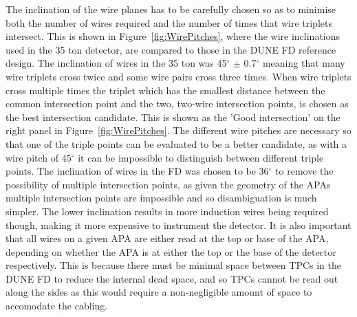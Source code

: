 The inclination of the wire planes has to be carefully chosen so as to minimise both the number of wires required and the number of times that wire triplets intersect. This is shown in Figure~\ref{fig:WirePitches}, where the wire inclinations used in the 35 ton detector, are compared to those in the DUNE FD reference design. The inclination of wires in the 35 ton was 45$^{\circ}$ $\pm$ 0.7$^{\circ}$ meaning that many wire triplets cross twice and some wire pairs cross three times. When wire triplets cross multiple times the triplet which has the smallest distance between the common intersection point and the two, two-wire intersection points, is chosen as the best intersection candidate. This is shown as the 'Good intersection' on the right panel in Figure~\ref{fig:WirePitches}. The different wire pitches are necessary so that one of the triple points can be evaluated to be a better candidate, as with a wire pitch of 45$^{\circ}$ it can be impossible to distinguish between different triple points. The inclination of wires in the FD was chosen to be 36$^{\circ}$ to remove the possibility of multiple intersection points, as given the geometry of the APAs multiple intersection points are impossible and so disambiguation is much simpler. The lower inclination results in more induction wires being required though, making it more expensive to instrument the detector. It is also important that all wires on a given APA are either read at the top or base of the APA, depending on whether the APA is at either the top or the base of the detector respectively. This is because there must be minimal space between TPCs in the DUNE FD to reduce the internal dead space, and so TPCs cannot be read out along the sides as this would require a non-negligible amount of space to accomodate the cabling.\\

